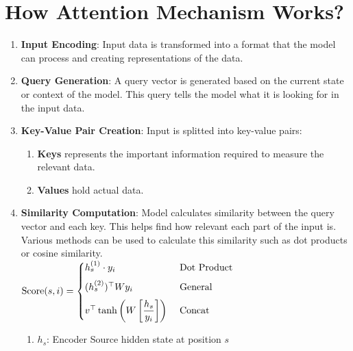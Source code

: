 \section{How Attention Mechanism Works?}

\begin{enumerate}
    \item \textbf{Input Encoding}: Input data is transformed into a format that the model can process and creating representations of the data.
    \hfill \cite{geeksforgeeks/artificial-intelligence/ml-attention-mechanism/}

    \item \textbf{Query Generation}: A query vector is generated based on the current state or context of the model. 
    This query tells the model what it is looking for in the input data.
    \hfill \cite{geeksforgeeks/artificial-intelligence/ml-attention-mechanism/}

    \item \textbf{Key-Value Pair Creation}: Input is splitted into key-value pairs:
    \hfill \cite{geeksforgeeks/artificial-intelligence/ml-attention-mechanism/}
    \begin{enumerate}
        \item \textbf{Keys} represents the important information required to measure the relevant data.
        \hfill \cite{geeksforgeeks/artificial-intelligence/ml-attention-mechanism/}
        
        \item \textbf{Values} hold actual data.
        \hfill \cite{geeksforgeeks/artificial-intelligence/ml-attention-mechanism/}
    \end{enumerate}

    \item \textbf{Similarity Computation}: Model calculates similarity between the query vector and each key. This helps find how relevant each part of the input is. 
    Various methods can be used to calculate this similarity such as dot products or cosine similarity.
    \hfill \cite{geeksforgeeks/artificial-intelligence/ml-attention-mechanism/}
    \\[0.2cm]
    $
        \text{Score}(s,i) = 
        \begin{cases}
            h_s^{(1)}\cdot y_i & \text{ Dot Product} \\[0.2cm]
            (h_s^{(2)})^\top Wy_i & \text{ General} \\[0.2cm]
            v^\top \tanh\left(W\left[\dfrac{h_s}{y_i}\right]\right) & \text{ Concat}
        \end{cases}
    $
    \hfill \cite{geeksforgeeks/artificial-intelligence/ml-attention-mechanism/}
    \\[0.2cm]
    \begin{enumerate}
        \item $h_s$: Encoder Source hidden state at position $s$
        \hfill \cite{geeksforgeeks/artificial-intelligence/ml-attention-mechanism/}


\end{enumerate}
\end{enumerate}

